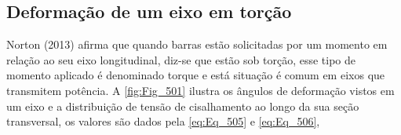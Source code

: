 %
%
%
%
%
%
%
%
%
%
%
%
%
%
%
%
%
%
%
%
%
%
%

\subsection{Deformação de um eixo em torção}

Norton (2013) afirma que quando barras estão solicitadas por um momento em relação ao seu eixo longitudinal, diz-se que estão sob torção, esse tipo de momento aplicado é denominado torque e está situação é comum em eixos que transmitem potência. A \autoref{fig:Fig_501} ilustra os ângulos de deformação vistos em um eixo e a distribuição de tensão de cisalhamento ao longo da sua seção transversal, os valores são dados pela \autoref{eq:Eq_505} e \autoref{eq:Eq_506},


